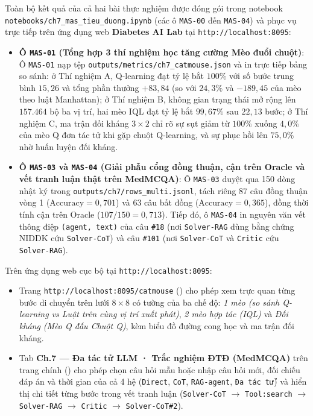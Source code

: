 Toàn bộ kết quả của cả hai bài thực nghiệm được đóng gói trong notebook \texttt{notebooks/ch7\_mas\_tieu\_duong.ipynb} (các ô \texttt{MAS-00} đến \texttt{MAS-04}) và phục vụ trực tiếp trên ứng dụng web \textbf{Diabetes AI Lab} tại \texttt{http://localhost:8095}:
\begin{itemize}
  \item \textbf{Ô \texttt{MAS-01} (Tổng hợp 3 thí nghiệm học tăng cường Mèo đuổi chuột)}: Ô \texttt{MAS-01} nạp tệp \texttt{outputs/metrics/ch7\_catmouse.json} và in trực tiếp bảng so sánh: ở Thí nghiệm A, Q-learning đạt tỷ lệ bắt $100\%$ với số bước trung bình $15{,}26$ và tổng phần thưởng $+83{,}84$ (so với $24{,}3\%$ và $-189{,}45$ của mèo theo luật Manhattan); ở Thí nghiệm B, không gian trạng thái mở rộng lên $157.464$ bộ ba vị trí, hai mèo IQL đạt tỷ lệ bắt $99{,}67\%$ sau $22{,}13$ bước; ở Thí nghiệm C, ma trận đối kháng $3\times 2$ chỉ rõ sự sụt giảm từ $100\%$ xuống $4{,}0\%$ của mèo Q đơn tác tử khi gặp chuột Q-learning, và sự phục hồi lên $75{,}0\%$ nhờ huấn luyện đối kháng.
  \item \textbf{Ô \texttt{MAS-03} và \texttt{MAS-04} (Giải phẫu cổng đồng thuận, cận trên Oracle và vết tranh luận thật trên MedMCQA)}: Ô \texttt{MAS-03} duyệt qua 150 dòng nhật ký trong \texttt{outputs/ch7/rows\_multi.jsonl}, tách riêng 87 câu đồng thuận vòng 1 ($\text{Accuracy}=0{,}701$) và 63 câu bất đồng ($\text{Accuracy}=0{,}365$), đồng thời tính cận trên Oracle ($107/150 = 0{,}713$). Tiếp đó, ô \texttt{MAS-04} in nguyên văn vết thông điệp \texttt{(agent, text)} của câu \texttt{\#18} (nơi \texttt{Solver-RAG} dùng bằng chứng NIDDK cứu \texttt{Solver-CoT}) và câu \texttt{\#101} (nơi \texttt{Solver-CoT} và \texttt{Critic} cứu \texttt{Solver-RAG}).
\end{itemize}

Trên ứng dụng web cục bộ tại \texttt{http://localhost:8095}:
\begin{itemize}
  \item Trang \texttt{http://localhost:8095/catmouse} () cho phép xem trực quan từng bước di chuyển trên lưới $8\times 8$ có tường của ba chế độ: \emph{1 mèo (so sánh Q-learning vs Luật trên cùng vị trí xuất phát)}, \emph{2 mèo hợp tác (IQL)} và \emph{Đối kháng (Mèo Q đấu Chuột Q)}, kèm biểu đồ đường cong học và ma trận đối kháng.
  \item Tab \textbf{Ch.7 — Đa tác tử LLM · Trắc nghiệm ĐTĐ (MedMCQA)} trên trang chính () cho phép chọn câu hỏi mẫu hoặc nhập câu hỏi mới, đối chiếu đáp án và thời gian của cả 4 hệ (\texttt{Direct}, \texttt{CoT}, \texttt{RAG-agent}, \texttt{Đa tác tử}) và hiển thị chi tiết từng bước trong vết tranh luận (\texttt{Solver-CoT} $\to$ \texttt{Tool:search} $\to$ \texttt{Solver-RAG} $\to$ \texttt{Critic} $\to$ \texttt{Solver-CoT\#2}).
\end{itemize}

